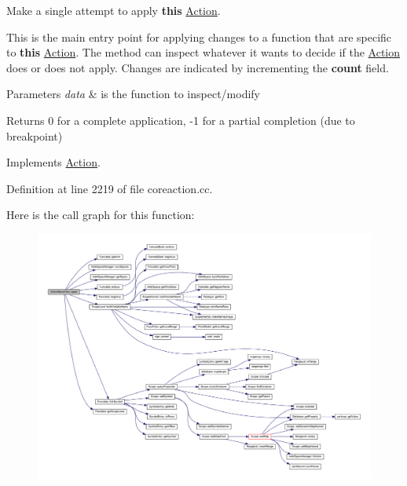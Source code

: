 Make a single attempt to apply {\bfseries{this}} \mbox{\hyperlink{class_action}{Action}}. 

This is the main entry point for applying changes to a function that are specific to {\bfseries{this}} \mbox{\hyperlink{class_action}{Action}}. The method can inspect whatever it wants to decide if the \mbox{\hyperlink{class_action}{Action}} does or does not apply. Changes are indicated by incrementing the {\bfseries{count}} field. 
\begin{DoxyParams}{Parameters}
{\em data} & is the function to inspect/modify \\
\hline
\end{DoxyParams}
\begin{DoxyReturn}{Returns}
0 for a complete application, -\/1 for a partial completion (due to breakpoint) 
\end{DoxyReturn}


Implements \mbox{\hyperlink{class_action_aac1c3999d6c685b15f5d9765a4d04173}{Action}}.



Definition at line 2219 of file coreaction.\+cc.

Here is the call graph for this function\+:
\nopagebreak
\begin{figure}[H]
\begin{center}
\leavevmode
\includegraphics[width=350pt]{class_action_name_vars_aac0b5f8eea942d73f9fcdb4fca44f1bd_cgraph}
\end{center}
\end{figure}
\mbox{\label{class_action_name_vars_a93b62205bd339268977f7ae15f665eef}} 
